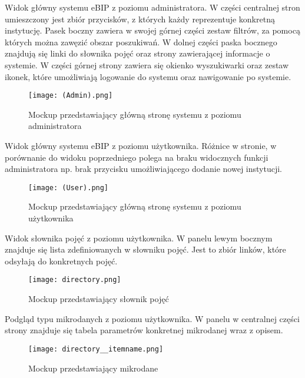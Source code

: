 \documentclass{article}
\begin{document}
	Widok główny systemu eBIP z poziomu administratora. W części centralnej stron umieszczony jest zbiór
	przycisków, z których każdy reprezentuje konkretną instytucję. Pasek boczny
	zawiera w swojej górnej części zestaw filtrów, za pomocą których można zawęzić
	obszar poszukiwań. W dolnej części paska bocznego znajdują się linki do słownika
	pojęć oraz strony zawierającej informacje o systemie.
	W części górnej strony zawiera się okienko wyszukiwarki oraz zestaw ikonek, 
	które umożliwiają logowanie do systemu oraz nawigowanie po systemie.
\begin{figure}[h!]
	\texttt{[image: (Admin).png]}
	\centering
	\caption{Mockup przedstawiający główną stronę systemu z poziomu administratora}
\end{figure}


	Widok główny systemu eBIP z poziomu użytkownika. Różnice w stronie, w porównanie
	do widoku poprzedniego polega na braku widocznych funkcji administratora np.
	brak przycisku umożliwiającego dodanie nowej instytucji.
\begin{figure}[h!]
	\texttt{[image: (User).png]}
	\centering
	\caption{Mockup przedstawiający główną stronę systemu z poziomu użytkownika}
\end{figure}
	\newpage
	
	
	Widok słownika pojęć z poziomu użytkownika. W panelu lewym bocznym znajduje
	się lista zdefiniowanych w słowniku pojęć. Jest to zbiór linków, które odsyłają
	do konkretnych pojęć.
\begin{figure}[h!]
	\texttt{[image: directory.png]}
	\centering
	\caption{Mockup przedstawiający słownik pojęć}
\end{figure}
	Podgląd typu mikrodanych z poziomu użytkownika. W panelu w centralnej części strony
	znajduje się tabela parametrów konkretnej mikrodanej wraz z opisem.

\begin{figure}[h!]
	\texttt{[image: directory\_\_itemname.png]}
	\centering
	\caption{Mockup przedstawiający mikrodane}
\end{figure}
	\newpage
	
\end{document}
